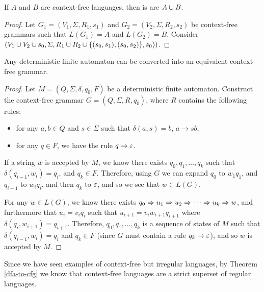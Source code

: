 \begin{thm}
    If $A$ and $B$ are context-free languages, then is are $A \cup B$.
\end{thm}

\begin{proof}
    Let $G_1 = (V_1, \Sigma, R_1, s_1)$ and $G_2 = (V_2, \Sigma, R_2, s_2)$ be context-free grammars such that $L(G_1) = A$ and $L(G_2) = B$. Consider $(V_1 \cup V_2 \cup s_0, \Sigma, R_1 \cup R_2 \cup \{(s_0, s_1), (s_0, s_2)\}, s_0))$.
\end{proof}

\begin{thm}\label{dfa-to-cfg}
    Any deterministic finite automaton can be converted into an equivalent context-free grammar.
\end{thm}

\begin{proof}
    Let $M = (Q, \Sigma, \delta, q_0, F)$ be a deterministic finite automaton. Construct the context-free grammar $G = (Q, \Sigma, R, q_0)$, where $R$ contains the following rules:
    \begin{itemize}
        \item for any $a, b \in Q$ and $s \in \Sigma$ such that $\delta(a, s) = b$, $a \to sb$,
        \item for any $q \in F$, we have the rule $q \to \varepsilon$. 
    \end{itemize}

    If a string $w$ is accepted by $M$, we know there exists $q_0, q_1, \ldots, q_k$ such that $\delta(q_{i-1}, w_i) = q_{i}$, and $q_k \in F$. Therefore, using $G$ we can expand $q_0$ to $w_1q_1$, and $q_{i-1}$ to $w_iq_i$, and then $q_k$ to $\varepsilon$, and so we see that $w \in L(G)$.

    For any $w \in L(G)$, we know there exists $q_0 \Rightarrow u_1 \Rightarrow u_2 \Rightarrow \cdots \Rightarrow u_k \Rightarrow w$, and furthermore that $u_i = v_iq_{i}$ such that $u_{i+1} = v_iw_{i+1}q_{i+1}$ where $\delta(q_i, w_{i+1}) = q_{i+1}$. Therefore, $q_0, q_1, \ldots, q_k$ is a sequence of states of $M$ such that $\delta(q_{i-1}, w_i) = q_i$ and $q_k \in F$ (since $G$ must contain a rule $q_{k} \to \varepsilon$), and so $w$ is accepted by $M$.
\end{proof}

\begin{rmk}
    Since we have seen examples of context-free but irregular languages, by Theorem \ref{dfa-to-cfg} we know that context-free languages are a strict superset of regular languages.
\end{rmk}

